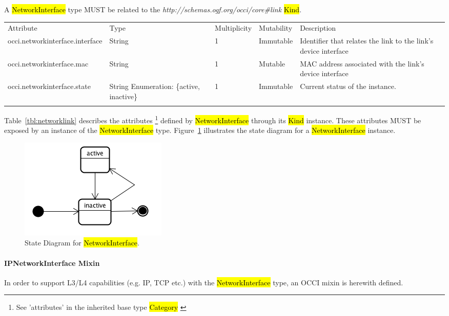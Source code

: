 \documentclass[10pt,a4paper]{article}
\begin{document}
A \hl{NetworkInterface} type MUST be related to the \textit{http://schemas.ogf.org/occi/core\#link} 
\hl{Kind}.

{
	\begin{tabular}{lp{2.5cm}p{1cm}lp{6cm}}
	\toprule
	Attribute&Type&Multi\-plicity&Mutability&Description\\
	\colrule
	occi.networkinterface.interface & String & 1 & Immutable 
	& Identifier that relates the link to the link's device interface\\
	occi.networkinterface.mac & String & 1 & Mutable 
	& MAC address associated with the link's device interface\\
	occi.networkinterface.state & String Enumeration: \{active, inactive\}& 1 
	& Immutable & Current status of the instance.\\
	\botrule
	\end{tabular}
}
Table~\ref{tbl:networklink} describes the attributes \footnote{See ’attributes’ in the inherited 
base type \hl{Category}  \cite{occi:core}} 
defined by \hl{NetworkInterface} through its \hl{Kind} instance. These attributes
MUST be exposed by an instance of the \hl{NetworkInterface} type. 
Figure~\ref{fig:networklink_state} illustrates the state diagram for a \hl{NetworkInterface} instance.

\begin{figure}[!h]
	\centering
	\includegraphics[scale=0.4]{figs/infra-link-state.png}
	\caption{State Diagram for \hl{NetworkInterface}.}
	\label{fig:networklink_state}
\end{figure}

\paragraph{IPNetworkInterface Mixin}
In order to support L3/L4 capabilities (e.g. IP, TCP etc.) with the \hl{NetworkInterface} type, an 
OCCI mixin is herewith defined.
\end{document}
